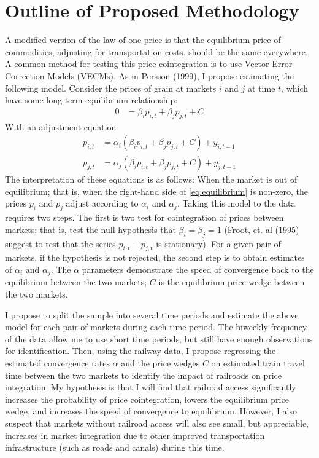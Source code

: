 \documentclass[12pt,twoside]{article}
\begin{document}
\section{Outline of Proposed Methodology}
A modified version of the law of one price is that the equilibrium price of commodities, adjusting for transportation costs, should be the same everywhere.
A common method for testing this price cointegration is to use Vector Error Correction Models (VECMs).
As in Persson (1999), I propose estimating the following model.
Consider the prices of grain at markets $i$ and $j$ at time $t$, which have some long-term equilibrium relationship:
\begin{align}\label{eq:equilibrium}
	0 &= \beta_{i} p_{i,t} + \beta_{j} p_{j,t} + C
\end{align}
With an adjustment equation
\begin{align}\label{eq:adjustment}
	p_{i,t} &= \alpha_i (\beta_{i} p_{i,t} + \beta_{j} p_{j,t} + C) + y_{i,t-1} \\
	p_{j,t} &= \alpha_j (\beta_{i} p_{i,t} + \beta_{j} p_{j,t} + C) + y_{j,t-1}
\end{align}
The interpretation of these equations is as follows: When the market is out of equilibrium; that is, when the right-hand side of \eqref{eq:equilibrium} is non-zero, the prices $p_i$ and $p_j$ adjust according to $\alpha_i$ and $\alpha_j$.
Taking this model to the data requires two steps.
The first is two test for cointegration of prices between markets; that is, test the null hypothesis that $\beta_i = \beta_j = 1$ (Froot, et. al (1995) suggest to test that the series $p_{i,t} - p_{j,t}$ is stationary).
For a given pair of markets, if the hypothesis is not rejected, the second step is to obtain estimates of $\alpha_i$ and $\alpha_j$.
The $\alpha$ parameters demonstrate the speed of convergence back to the equilibrium between the two markets; $C$ is the equilibrium price wedge between the two markets.

I propose to split the sample into several time periods and estimate the above model for each pair of markets during each time period.
The biweekly frequency of the data allow me to use short time periods, but still have enough observations for identification.
Then, using the railway data, I propose regressing the estimated convergence rates $\alpha$ and the price wedges $C$ on estimated train travel time between the two markets to identify the impact of railroads on price integration.
My hypothesis is that I will find that railroad access significantly increases the probability of price cointegration, lowers the equilibrium price wedge, and increases the speed of convergence to equilibrium.
However, I also suspect that markets without railroad access will also see small, but appreciable, increases in market integration due to other improved transportation infrastructure (such as roads and canals) during this time.
\end{document}
